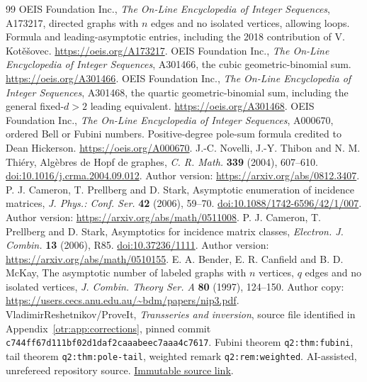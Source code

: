 \documentclass[11pt,a4paper]{article}
\theoremstyle{definition}\newtheorem{definition}[theorem]{Definition}
\theoremstyle{remark}\newtheorem{remark}[theorem]{Remark}
\begin{document}
\begin{thebibliography}{99}
 OEIS Foundation Inc., \emph{The On-Line Encyclopedia of Integer Sequences}, A173217, directed graphs with $n$ edges and no isolated vertices, allowing loops. Formula and leading-asymptotic entries, including the 2018 contribution of V. Kot\v e\v sovec. \url{https://oeis.org/A173217}.
 OEIS Foundation Inc., \emph{The On-Line Encyclopedia of Integer Sequences}, A301466, the cubic geometric-binomial sum. \url{https://oeis.org/A301466}.
 OEIS Foundation Inc., \emph{The On-Line Encyclopedia of Integer Sequences}, A301468, the quartic geometric-binomial sum, including the general fixed-$d>2$ leading equivalent. \url{https://oeis.org/A301468}.
 OEIS Foundation Inc., \emph{The On-Line Encyclopedia of Integer Sequences}, A000670, ordered Bell or Fubini numbers. Positive-degree pole-sum formula credited to Dean Hickerson. \url{https://oeis.org/A000670}.
 J.-C. Novelli, J.-Y. Thibon and N. M. Thi\'ery, Alg\`ebres de Hopf de graphes, \emph{C. R. Math.} \textbf{339} (2004), 607--610. \href{https://doi.org/10.1016/j.crma.2004.09.012}{doi:10.1016/j.crma.2004.09.012}. Author version: \url{https://arxiv.org/abs/0812.3407}.
 P. J. Cameron, T. Prellberg and D. Stark, Asymptotic enumeration of incidence matrices, \emph{J. Phys.: Conf. Ser.} \textbf{42} (2006), 59--70. \href{https://doi.org/10.1088/1742-6596/42/1/007}{doi:10.1088/1742-6596/42/1/007}. Author version: \url{https://arxiv.org/abs/math/0511008}.
 P. J. Cameron, T. Prellberg and D. Stark, Asymptotics for incidence matrix classes, \emph{Electron. J. Combin.} \textbf{13} (2006), R85. \href{https://doi.org/10.37236/1111}{doi:10.37236/1111}. Author version: \url{https://arxiv.org/abs/math/0510155}.
 E. A. Bender, E. R. Canfield and B. D. McKay, The asymptotic number of labeled graphs with $n$ vertices, $q$ edges and no isolated vertices, \emph{J. Combin. Theory Ser. A} \textbf{80} (1997), 124--150. Author copy: \url{https://users.cecs.anu.edu.au/~bdm/papers/nip3.pdf}.
 VladimirReshetnikov/ProveIt, \emph{Transseries and inversion}, source file identified in Appendix~\ref{otr:app:corrections}, pinned commit \texttt{c744ff67d111bf02d1daf2caaabeec7aaa4c7617}. Fubini theorem \texttt{q2:thm:fubini}, tail theorem \texttt{q2:thm:pole-tail}, weighted remark \texttt{q2:rem:weighted}. AI-assisted, unrefereed repository source. \href{https://github.com/VladimirReshetnikov/ProveIt/blob/c744ff67d111bf02d1daf2caaabeec7aaa4c7617/Analysis/Transseries/docs/series-and-transseries/Transseries_And_Inversion/transseries_and_inversion.tex}{Immutable source link}.

\end{thebibliography}
\end{document}
